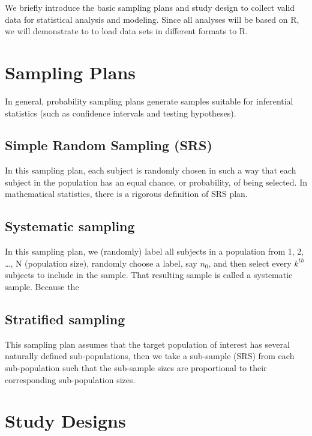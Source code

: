 \documentclass[
]{book}
\begin{document}
We briefly introduce the basic sampling plans and study design to collect valid data for statistical analysis and modeling. Since all analyses will be based on R, we will demonstrate to to load data sets in different formats to R.

\hypertarget{sampling-plans}{%
\section{Sampling Plans}\label{sampling-plans}}

In general, probability sampling plans generate samples suitable for inferential statistics (such as confidence intervals and testing hypotheses).

\hypertarget{simple-random-sampling-srs}{%
\subsection{Simple Random Sampling (SRS)}\label{simple-random-sampling-srs}}

In this sampling plan, each subject is randomly chosen in such a way that each subject in the population has an equal chance, or probability, of being selected. In mathematical statistics, there is a rigorous definition of SRS plan.

\hypertarget{systematic-sampling}{%
\subsection{Systematic sampling}\label{systematic-sampling}}

In this sampling plan, we (randomly) label all subjects in a population from 1, 2, \ldots, N (population size), randomly choose a label, say \(n_0\), and then select every \(k^{th}\) subjects to include in the sample. That resulting sample is called a systematic sample. Because the

\hypertarget{stratified-sampling}{%
\subsection{Stratified sampling}\label{stratified-sampling}}

This sampling plan assumes that the target population of interest has several naturally defined sub-populations, then we take a sub-sample (SRS) from each sub-population such that the sub-sample sizes are proportional to their corresponding sub-population sizes.

\hypertarget{study-designs}{%
\section{Study Designs}\label{study-designs}}
\end{document}
